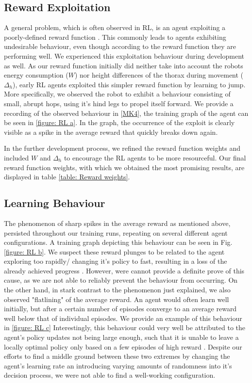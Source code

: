 \subsection{Reward Exploitation}
A general problem, which is often observed in RL, is an agent exploiting a poorly-defined reward function \parencite{silver2015}.
This commonly leads to agents exhibiting undesirable behaviour, even though according to the reward function they are performing well.
We experienced this exploitation behaviour during development as well.
As our reward function initially did neither take into account the robots energy consumption ($W$) nor height differences of the thorax during movement ($ \Delta_h$), early RL agents exploited this simpler reward function by learning to jump.
More specifically, we observed the robot to exhibit a behaviour consisting of small, abrupt hops, using it's hind legs to propel itself forward.
We provide a recording of the observed behaviour in [\hyperref[vid: MK4]{MK4}], the training graph of the agent can be seen in \ref{figure: RL a}.
In the graph, the occurrence of the exploit is clearly visible as a spike in the average reward that quickly breaks down again.

In the further development process, we refined the reward function weights and included $W$ and $\Delta_h$ to encourage the RL agents to be more resourceful. 
Our final reward function weights, with which we obtained the most promising results, are displayed in table \ref{table: Reward weights}.


\subsection{Learning Behaviour}
The phenomenon of sharp spikes in the average reward as mentioned above, persisted throughout our training runs, repeating on several different agent configurations.
A training graph depicting this behaviour can be seen in Fig. \ref{figure: RL b}.
We suspect these reward plunges to be related to the agent exploring too rapidly/ changing it's policy to fast, resulting in a loss of the already achieved progress \parencite{silver2015}.
However, were cannot provide a definite prove of this cause, as we are not able to reliably prevent the behaviour from occurring.
On the other hand, in stark contrast to the phenomenon just explained, we also observed "flatlining" of the average reward.
An agent would often learn well initially, but after a certain number of episodes converge to an average reward well below that of individual episodes.
We provide an example of this behaviour in \ref{figure: RL c}
Interestingly, this behaviour could very well be attributed to the agent's policy updates not being large enough, such that it is unable to leave a locally optimal policy only based on a few episodes of high reward \parencite{silver2015}.
Despite our efforts to find a middle ground between these two extremes by changing the agent's learning rate an introducing varying amounts of randomness into it's decision process, we were not able to find a well-working configuration.


